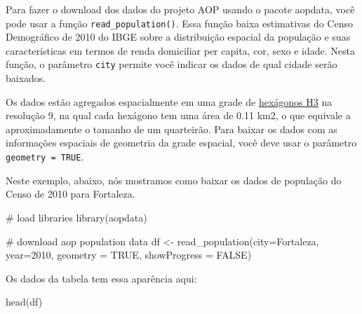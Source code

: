 \documentclass[
  letterpaper,
  DIV=11,
  numbers=noendperiod]{scrreprt}
\newenvironment{Shaded}{\begin{snugshade}}{\end{snugshade}}
\newcommand{\AttributeTok}[1]{\textcolor[rgb]{0.40,0.45,0.13}{#1}}
\newcommand{\CommentTok}[1]{\textcolor[rgb]{0.37,0.37,0.37}{#1}}
\newcommand{\ConstantTok}[1]{\textcolor[rgb]{0.56,0.35,0.01}{#1}}
\newcommand{\DecValTok}[1]{\textcolor[rgb]{0.68,0.00,0.00}{#1}}
\newcommand{\FunctionTok}[1]{\textcolor[rgb]{0.28,0.35,0.67}{#1}}
\newcommand{\NormalTok}[1]{\textcolor[rgb]{0.00,0.23,0.31}{#1}}
\newcommand{\OtherTok}[1]{\textcolor[rgb]{0.00,0.23,0.31}{#1}}
\newcommand{\StringTok}[1]{\textcolor[rgb]{0.13,0.47,0.30}{#1}}
\begin{document}
Para fazer o download dos dados do projeto AOP usando o pacote aopdata,
você pode usar a função \texttt{read\_population()}. Essa função baixa
estimativas do Censo Demográfico de 2010 do IBGE sobre a distribuição
espacial da população e suas características em termos de renda
domiciliar per capita, cor, sexo e idade. Nesta função, o parâmetro
\texttt{city} permite você indicar os dados de qual cidade serão
baixados.

Os dados estão agregados espacialmente em uma grade de
\href{https://h3geo.org/}{hexágonos H3} na resolução 9, na qual cada
hexágono tem uma área de 0.11 km2, o que equivale a aproximadamente o
tamanho de um quarteirão. Para baixar os dados com as informações
espaciais de geometria da grade espacial, você deve usar o parâmetro
\texttt{geometry\ =\ TRUE}.

Neste exemplo, abaixo, nós mostramos como baixar os dados de população
do Censo de 2010 para Fortaleza.

\begin{Shaded}
\begin{Highlighting}[]
\CommentTok{\# load libraries}
\FunctionTok{library}\NormalTok{(aopdata)}

\CommentTok{\# download aop population data}
\NormalTok{df }\OtherTok{\textless{}{-}} \FunctionTok{read\_population}\NormalTok{(}\AttributeTok{city=}\StringTok{\textquotesingle{}Fortaleza\textquotesingle{}}\NormalTok{,}
                      \AttributeTok{year=}\DecValTok{2010}\NormalTok{,}
                      \AttributeTok{geometry =} \ConstantTok{TRUE}\NormalTok{,}
                      \AttributeTok{showProgress =} \ConstantTok{FALSE}\NormalTok{)}
\end{Highlighting}
\end{Shaded}

Os dados da tabela tem essa aparência aqui:

\begin{Shaded}
\begin{Highlighting}[]
\FunctionTok{head}\NormalTok{(df)}
\end{Highlighting}
\end{Shaded}
\end{document}
